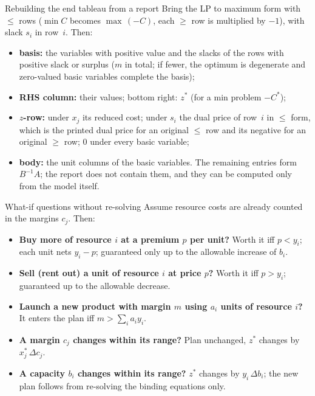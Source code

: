 \begin{rulebox}{Rebuilding the end tableau from a report}
Bring the LP to maximum form with $\le$ rows ($\min C$ becomes
$\max\,(-C)$, each $\ge$ row is multiplied by $-1$), with slack $s_{i}$ in
row~$i$. Then:
\begin{itemize}[leftmargin=1.6em,itemsep=0.3ex]
  \item \textbf{basis:} the variables with positive value and the slacks
        of the rows with positive slack or surplus ($m$ in total; if fewer,
        the optimum is degenerate and zero-valued basic variables complete
        the basis);
  \item \textbf{RHS column:} their values; bottom right: $z^{*}$ (for a
        min problem $-C^{*}$);
  \item \textbf{$z$-row:} under $x_{j}$ its reduced cost; under $s_{i}$
        the dual price of row~$i$ in $\le$ form, which is the printed dual
        price for an original $\le$ row and its negative for an original
        $\ge$ row; $0$ under every basic variable;
  \item \textbf{body:} the unit columns of the basic variables. The
        remaining entries form $B^{-1}A$; the report does not contain
        them, and they can be computed only from the model itself.
\end{itemize}
\end{rulebox}

\begin{rulebox}{What-if questions without re-solving}
Assume resource costs are already counted in the margins $c_{j}$. Then:
\begin{itemize}[leftmargin=1.6em,itemsep=0.3ex]
  \item \textbf{Buy more of resource $i$ at a premium $p$ per unit?}
        Worth it iff $p<y_{i}$; each unit nets $y_{i}-p$; guaranteed only
        up to the allowable increase of $b_{i}$.
  \item \textbf{Sell (rent out) a unit of resource $i$ at price $p$?}
        Worth it iff $p>y_{i}$; guaranteed up to the allowable decrease.
  \item \textbf{Launch a new product with margin $m$ using $a_{i}$ units
        of resource $i$?} It enters the plan iff
        $m>\sum_{i}a_{i}y_{i}$.
  \item \textbf{A margin $c_{j}$ changes within its range?} Plan
        unchanged, $z^{*}$ changes by $x_{j}^{*}\,\Delta c_{j}$.
  \item \textbf{A capacity $b_{i}$ changes within its range?}
        $z^{*}$ changes by $y_{i}\,\Delta b_{i}$; the new plan follows
        from re-solving the binding equations only.
\end{itemize}
\end{rulebox}

